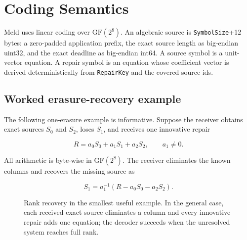 \documentclass[11pt]{article}
\newcommand{\meld}{Meld}
\newcommand{\code}[1]{\ifmmode\text{\texttt{#1}}\else\texttt{#1}\fi}
\newcommand{\field}[1]{\code{#1}}
\newcommand{\gf}{\ensuremath{\mathrm{GF}(2^8)}}
\begin{document}
\section{Coding Semantics}
\label{sec:coding}

\meld{} uses linear coding over \gf{}. An algebraic source is
\field{SymbolSize}+12 bytes: a zero-padded application prefix, the exact source
length as big-endian uint32, and the exact deadline as big-endian int64. A source
symbol is a unit-vector equation. A repair symbol is an equation whose
coefficient vector is derived deterministically from \field{RepairKey} and the
covered source ids.

\subsection{Worked erasure-recovery example}

The following one-erasure example is informative. Suppose the receiver obtains
exact sources $S_0$ and $S_2$, loses $S_1$, and receives one innovative repair

\[
  R = a_0 S_0 + a_1 S_1 + a_2 S_2, \qquad a_1 \ne 0.
\]

All arithmetic is byte-wise in \gf{}. The receiver eliminates the known columns
and recovers the missing source as

\[
  S_1 = a_1^{-1}\left(R-a_0S_0-a_2S_2\right).
\]

\begin{figure}[htbp]
\centering
{}
\caption{Rank recovery in the smallest useful example. In the general case,
each received exact source eliminates a column and every innovative repair adds
one equation; the decoder succeeds when the unresolved system reaches full rank.}
\label{fig:rank-example}
\end{figure}
\end{document}
